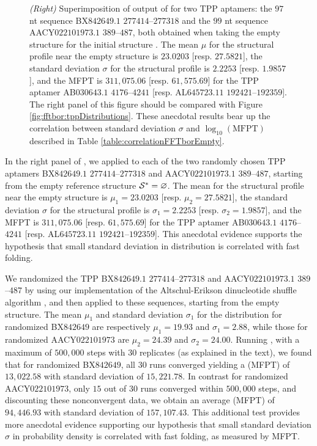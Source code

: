 \begin{figure}[!ht]
{{\em (Right)}
Superimposition of output of \fftbor for two TPP \rb aptamers: the
$97$ nt sequence BX$842649.1$ $277414$--$277318$ and the
$99$ nt sequence AACY$022101973.1$ $389$--$487$, both obtained when
taking the empty structure for the initial structure \strSt.
The mean $\mu$ for the \fftbor structural profile near the empty
structure is $23.0203$  [resp. $27.5821$], the
standard deviation $\sigma$ for the \fftbor structural profile
is $2.2253$  [resp. $1.9857$], and the \kinfold MFPT is
$311,075.06$ [resp. $61,575.69$] for the TPP \rb aptamer
AB$030643.1$ $4176$--$4241$ [resp. AL$645723.11$ $192421$--$192359$].
The right panel of this figure should be compared with Figure
\ref{fig:fftbor:tppDistributions}.
These anecdotal results bear up the correlation between standard deviation
$\sigma$ and $\log_{10}(\text{MFPT})$ described in Table \ref{table:correlationFFTborEmpty}.
}
\label{fig:fftbor:correlationFFTborEmpty}
\end{figure}

In the right panel of , we
applied \fftbor to each of the two randomly chosen TPP \rb
aptamers BX$842649.1$ $277414$--$277318$ and AACY$022101973.1$ $389$--$487$, starting
from the empty reference structure $\mathcal S^*=\varnothing$.
The mean for the \fftbor structural profile near the empty
structure is $\mu_1=23.0203$  [resp. $\mu_2=27.5821$], the
standard deviation $\sigma$ for the \fftbor structural profile
is $\sigma_1=2.2253$  [resp. $\sigma_2=1.9857$], and the \kinfold MFPT is
$311,075.06$ [resp. $61,575.69$] for the TPP \rb aptamer
AB$030643.1$ $4176$--$4241$ [resp.  AL$645723.11$ $192421$--$192359$]. This anecdotal evidence supports the hypothesis that small standard deviation in \fftbor distribution is correlated with fast folding.

We randomized the TPP \rbs BX$842649.1$ $277414$--$277318$ and AACY$022101973.1$ $389$--$487$ by using our implementation of the Altschul-Erikson dinucleotide shuffle algorithm
\citep{altschulErikson:dinucleotideShuffle}, and then applied \fftbor to these
sequences, starting from the empty structure.  The mean $\mu_1$ and standard
deviation $\sigma_1$ for the \fftbor distribution for randomized BX$842649$ are
respectively $\mu_1=19.93$ and $\sigma_1=2.88$, while those for randomized
AACY$022101973$ are $\mu_2=24.39$ and $\sigma_2=24.00$. Running \kinfold, with a
maximum of $500,000$ steps with $30$ replicates (as explained in the text), we
found
that for randomized BX$842649$, all $30$ runs converged yielding a \mfpt
(MFPT) of $13,022.58$ with standard deviation of $15,221.78$. In contrast for
randomized AACY$022101973$, only $15$ out of $30$ runs converged within $500,000$ steps,
and discounting these nonconvergent data, we obtain an average \mfpt
(MFPT) of $94,446.93$ with standard deviation of $157,107.43$. This additional
test provides more anecdotal evidence supporting our hypothesis that small
standard deviation $\sigma$ in \fftbor probability density is correlated with fast folding, as measured by MFPT.

